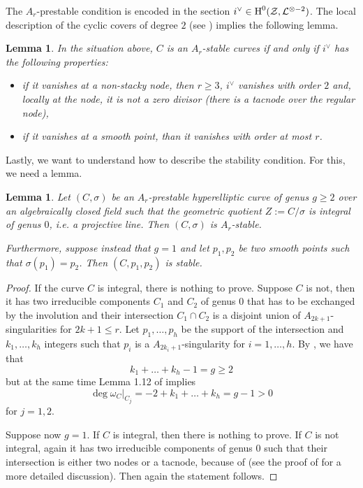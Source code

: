 \documentclass{alggeom}
\numberwithin{equation}{section}
\numberwithin{subsection}{section}
\newtheorem{lemma}[theorem]{Lemma}
\theoremstyle{definition}
\theoremstyle{remark}
\renewcommand\H{\operatorname{H}}
\begin{document}
The $A_r$-prestable condition is encoded in the section $i^{\vee}\in \H^0(\cZ,\cL^{\otimes -2})$. The local description of the cyclic covers of degree $2$ (see ) implies the following lemma.

\begin{lemma}
	In the situation above, $C$ is an $A_r$-stable curves if and only if $i^{\vee}$ has the following properties: 
	\begin{itemize}
		\item if it vanishes at a non-stacky node, then $r\geq 3$, $i^{\vee}$ vanishes with order $2$ and, locally at the node, it is not a zero divisor (there is a tacnode over the regular node),
		\item if it vanishes at a smooth point, than it vanishes with order at most $r$.
	\end{itemize}
\end{lemma}



Lastly, we want to understand how to describe the stability condition. For this, we need a lemma.

\begin{lemma}
	Let $(C,\sigma)$ be an $A_r$-prestable hyperelliptic curve of genus $g\geq 2$ over an algebraically closed field such that the geometric quotient $Z:=C/\sigma$ is integral of genus $0$, i.e. a projective line. Then $(C,\sigma)$ is $A_r$-stable. 
	
	Furthermore, suppose instead that $g=1$ and let $p_1,p_2$ be two smooth points such that $\sigma(p_1)=p_2$. Then $(C,p_1,p_2)$ is stable.
\end{lemma}
\begin{proof}
	If the curve $C$ is integral, there is nothing to prove. Suppose $C$ is not, then it has two irreducible components $C_1$ and $C_2$ of genus $0$ that has to be exchanged by the involution and their intersection $C_1 \cap C_2$ is a disjoint union of $A_{2k+1}$-singularities for $2k+1\leq r$. Let $p_1,\dots,p_h$ be the support of the intersection and $k_1,\dots,k_h$ integers such that $p_i$ is a $A_{2k_i+1}$-singularity for $i=1,\dots,h$. By , we have that 
	$$  k_1+\dots+k_h-1=g\geq 2$$ 
	but at the same time Lemma 1.12 of \cite{Cat} implies
	$$\deg\omega_C\vert_{C_j}=-2+k_1+\dots+k_h=g-1>0$$
    for $j=1,2$. 
    
    Suppose now $g=1$. If $C$ is integral, then there is nothing to prove. If $C$ is not integral, again it has two irreducible components of genus $0$ such that their intersection is either two nodes or a tacnode, because of  (see the proof of  for a more detailed discussion). Then again the statement follows.
\end{proof}
\end{document}
